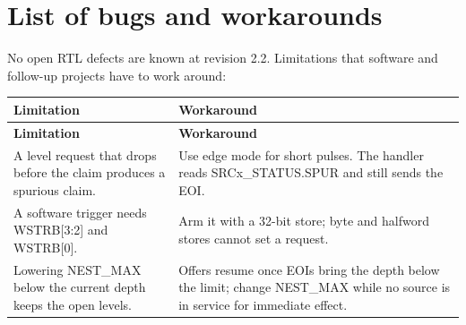 \documentclass[11pt]{article}
\begin{document}
\section{List of bugs and workarounds}
\noindent No open RTL defects are known at revision 2.2. Limitations that software and follow-up projects have to work around:\par\medskip
{\small
\begin{longtable}{@{}L{0.5000\dimexpr\linewidth-12pt\relax}L{0.5000\dimexpr\linewidth-12pt\relax}@{}}
\toprule
\textbf{Limitation} & \textbf{Workaround} \\ \midrule
\endfirsthead
\toprule
\textbf{Limitation} & \textbf{Workaround} \\ \midrule
\endhead
A level request that drops before the claim produces a spurious claim. & Use edge mode for short pulses. The handler reads SRCx\_STATUS.SPUR and still sends the EOI. \\ \addlinespace[3pt]
A software trigger needs WSTRB[3:2] and WSTRB[0]. & Arm it with a 32-bit store; byte and halfword stores cannot set a request. \\ \addlinespace[3pt]
Lowering NEST\_MAX below the current depth keeps the open levels. & Offers resume once EOIs bring the depth below the limit; change NEST\_MAX while no source is in service for immediate effect. \\*
\bottomrule\end{longtable}}
\end{document}
